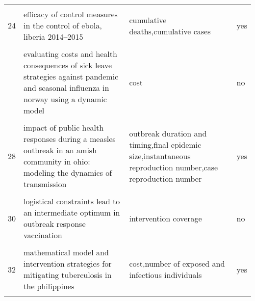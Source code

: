 \documentclass[
]{article}
\begin{document}
\begin{landscape}
\begin{longtable}{l>{\raggedright\arraybackslash}p{4cm}>{\raggedright\arraybackslash}p{6cm}l}
\cellcolor{gray!6}{23} & \cellcolor{gray!6}{disparities in spread and control of influenza in slums of delhi: findings from an agent-based modelling study} & \cellcolor{gray!6}{attack rate} & \cellcolor{gray!6}{no}\\
24 & efficacy of control measures in the control of ebola, liberia 2014–2015 & cumulative deaths,cumulative cases & yes\\
\cellcolor{gray!6}{25} & \cellcolor{gray!6}{epidemiology of the silent polio outbreak in rahat, israel, based on modeling of environmental surveillance data} & \cellcolor{gray!6}{cases averted} & \cellcolor{gray!6}{no}\\
\addlinespace
26 & evaluating costs and health consequences of sick leave strategies against pandemic and seasonal influenza in norway using a dynamic model & cost & no\\
\cellcolor{gray!6}{27} & \cellcolor{gray!6}{evaluating vaccination strategies to control foot-and-mouth disease: a country comparison study} & \cellcolor{gray!6}{outbreak duration and timing,total number of infected premises} & \cellcolor{gray!6}{no}\\
28 & impact of public health responses during a measles outbreak in an amish community in ohio: modeling the dynamics of transmission & outbreak duration and timing,final epidemic size,instantaneous reproduction number,case reproduction number & yes\\
\cellcolor{gray!6}{29} & \cellcolor{gray!6}{initial validation of a simulation model for estimating the impact of serogroup a neisseria meningitidis vaccination in the african meningitis belt} & \cellcolor{gray!6}{incidence} & \cellcolor{gray!6}{yes}\\
30 & logistical constraints lead to an intermediate optimum in outbreak response vaccination & intervention coverage & no\\
\addlinespace
\cellcolor{gray!6}{31} & \cellcolor{gray!6}{manipulation of contact network structure and the impact on foot-and-mouth disease transmission} & \cellcolor{gray!6}{final epidemic size} & \cellcolor{gray!6}{no}\\
32 & mathematical model and intervention strategies for mitigating tuberculosis in the philippines & cost,number of exposed and infectious individuals & yes\\
\cellcolor{gray!6}{33} & \cellcolor{gray!6}{measles outbreak response decision-making under uncertainty: a retrospective analysis} & \cellcolor{gray!6}{immunization threshold} & \cellcolor{gray!6}{yes}\\

\end{longtable}
\end{landscape}
\end{document}
